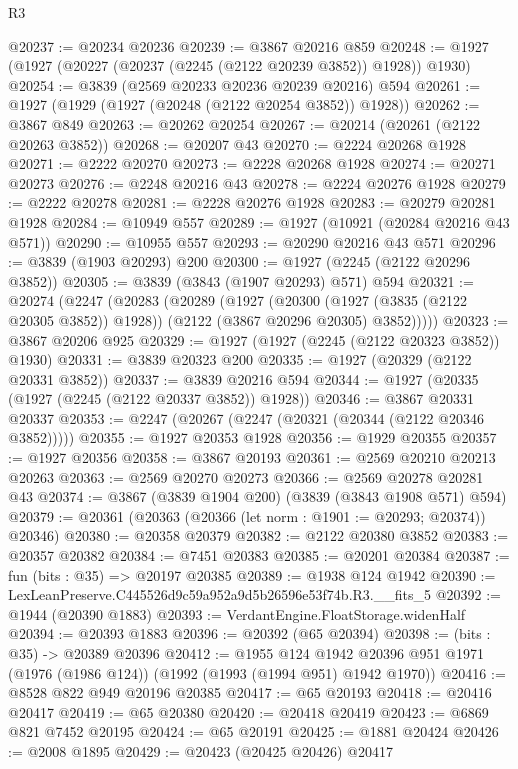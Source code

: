 \begin{lexlean}{R3}
\begin{coremodule}
@20237 := @20234 @20236
@20239 := @3867 @20216 @859
@20248 := @1927 (@1927 (@20227 (@20237 (@2245 (@2122 @20239 @3852)) @1928)) @1930)
@20254 := @3839 (@2569 @20233 @20236 @20239 @20216) @594
@20261 := @1927 (@1929 (@1927 (@20248 (@2122 @20254 @3852)) @1928))
@20262 := @3867 @849
@20263 := @20262 @20254
@20267 := @20214 (@20261 (@2122 @20263 @3852))
@20268 := @20207 @43
@20270 := @2224 @20268 @1928
@20271 := @2222 @20270
@20273 := @2228 @20268 @1928
@20274 := @20271 @20273
@20276 := @2248 @20216 @43
@20278 := @2224 @20276 @1928
@20279 := @2222 @20278
@20281 := @2228 @20276 @1928
@20283 := @20279 @20281 @1928
@20284 := @10949 @557
@20289 := @1927 (@10921 (@20284 @20216 @43 @571))
@20290 := @10955 @557
@20293 := @20290 @20216 @43 @571
@20296 := @3839 (@1903 @20293) @200
@20300 := @1927 (@2245 (@2122 @20296 @3852))
@20305 := @3839 (@3843 (@1907 @20293) @571) @594
@20321 := @20274
    (@2247
      (@20283
        (@20289
          (@1927
            (@20300 (@1927 (@3835 (@2122 @20305 @3852)) @1928))
            (@2122 (@3867 @20296 @20305) @3852)))))
@20323 := @3867 @20206 @925
@20329 := @1927 (@1927 (@2245 (@2122 @20323 @3852)) @1930)
@20331 := @3839 @20323 @200
@20335 := @1927 (@20329 (@2122 @20331 @3852))
@20337 := @3839 @20216 @594
@20344 := @1927 (@20335 (@1927 (@2245 (@2122 @20337 @3852)) @1928))
@20346 := @3867 @20331 @20337
@20353 := @2247 (@20267 (@2247 (@20321 (@20344 (@2122 @20346 @3852)))))
@20355 := @1927 @20353 @1928
@20356 := @1929 @20355
@20357 := @1927 @20356
@20358 := @3867 @20193
@20361 := @2569 @20210 @20213 @20263
@20363 := @2569 @20270 @20273
@20366 := @2569 @20278 @20281 @43
@20374 := @3867 (@3839 @1904 @200) (@3839 (@3843 @1908 @571) @594)
@20379 := @20361 (@20363 (@20366 (let norm : @1901 := @20293; @20374)) @20346)
@20380 := @20358 @20379
@20382 := @2122 @20380 @3852
@20383 := @20357 @20382
@20384 := @7451 @20383
@20385 := @20201 @20384
@20387 := fun (bits : @35) => @20197 @20385
@20389 := @1938 @124 @1942
@20390 := LexLeanPreserve.C445526d9c59a952a9d5b26596e53f74b.R3.__fits_5
@20392 := @1944 (@20390 @1883)
@20393 := VerdantEngine.FloatStorage.widenHalf
@20394 := @20393 @1883
@20396 := @20392 (@65 @20394)
@20398 := (bits : @35) -> @20389 @20396
@20412 := @1955
    @124
    @1942
    @20396
    @951
    @1971
    (@1976 (@1986 @124))
    (@1992 (@1993 (@1994 @951) @1942 @1970))
@20416 := @8528 @822 @949 @20196 @20385
@20417 := @65 @20193
@20418 := @20416 @20417
@20419 := @65 @20380
@20420 := @20418 @20419
@20423 := @6869 @821 @7452 @20195
@20424 := @65 @20191
@20425 := @1881 @20424
@20426 := @2008 @1895
@20429 := @20423 (@20425 @20426) @20417

\end{coremodule}
\end{lexlean}
